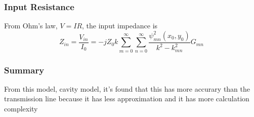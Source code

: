     \subsubsection{Input Resistance}
      \indent From Ohm's law, $V = IR$, the input impedance is
      \begin{equation}
        Z_{in} = \frac{V_{in}}{I_0} = -jZ_0k \sum_{m=0}^{\infty} \sum_{n=0}^{\infty} \frac{\psi_{mn}^2(x_0,y_0)}{k^2-k_{mn}^2} G_{mn}
      \end{equation}
    
    \subsubsection{Summary}
      \indent From this model, cavity model, it's found that this has more accurary than the transmission line
              because it has less approximation and it has more calculation complexity
    